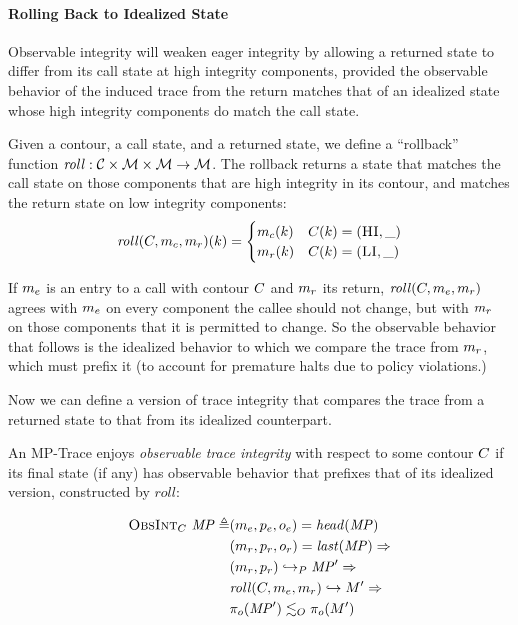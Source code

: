 \documentclass[acmsmall,review,anonymous]{acmart}\settopmatter{printfolios=true,printccs=false,printacmref=false}
\begin{document}
    \paragraph{Rolling Back to Idealized State}
      Observable integrity will weaken eager integrity by allowing a returned
      state to differ from its call state at high integrity components,
      provided the observable behavior of the induced trace from the return
      matches that of an idealized state whose high integrity components do
      match the call state.

      Given a contour, a call state, and a returned state, we define a
      ``rollback'' function \(\mathit{roll} : {\mathcal C} \times {\mathcal M} \times
      {\mathcal M} \rightarrow {\mathcal M}\). The rollback returns a state that matches
      the call state on those components that are high integrity in its
      contour, and matches the return state on low integrity components:
      \[\mathit{roll}(C,m_c,m_r)(k) =
      \begin{cases}
        m_c(k) & C(k) = (\textsc{HI},\_) \\
        m_r(k) & C(k) = (\textsc{LI},\_) \\
      \end{cases}\]

      If \(m_e\) is an entry to a call with contour \(C\) and
      \(m_r\) its return, \(\mathit{roll}(C,m_e,m_r)\)
      agrees with \(m_e\) on every component the callee should not change,
      but with \(m_r\) on those components that it is permitted to change.
      So the observable behavior that follows is the idealized behavior to
      which we compare the trace from \(m_r\), which must prefix it (to
      account for premature halts due to policy violations.)

      Now we can define a version of trace integrity that compares the trace
      from a returned state to that from its idealized counterpart.


      An MP-Trace enjoys {\em observable trace integrity} with respect to
      some contour \(C\) if its final state (if any) has observable
      behavior that prefixes that of its idealized version, constructed by
      \(\mathit{roll}\):

      \[\begin{split}
        \text{\sc ObsInt}_C ~ \mathit{MP} \triangleq
        & (m_e,p_e,o_e) = \mathit{head}(\mathit{MP}) \\
        & (m_r,p_r,o_r) = \mathit{last}(\mathit{MP}) \Rightarrow \\
        & (m_r,p_r) \hookrightarrow_P \mathit{MP}' \Rightarrow \\
        & \mathit{roll}(C,m_e,m_r) \hookrightarrow M' 
          \Rightarrow \\
        & \pi_o(\mathit{MP}') \lesssim_O \pi_o(M')
      \end{split}\]
\end{document}
